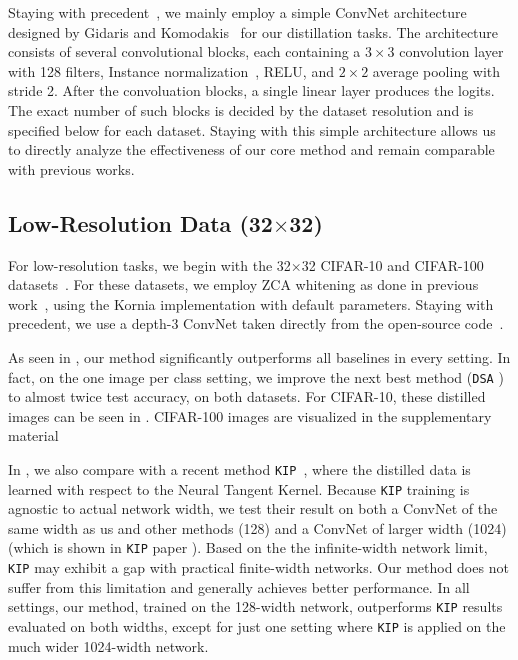 \documentclass[main.tex]{subfiles}
\begin{document}
Staying with precedent~\cite{dc, dsa, dm, nguyen2021dataset}, we mainly employ a simple ConvNet architecture designed by Gidaris and Komodakis~\cite{gidaris2018dynamic} for our distillation tasks. The architecture consists of several convolutional blocks, each containing a
$3\times 3$ convolution layer with 128 filters, Instance normalization~\cite{ulyanov2016instance}, RELU, and $2\times2$ average pooling with stride 2. After the convoluation blocks, a single linear layer produces the logits. The exact number of such blocks is decided by the dataset resolution and is specified below for each dataset.
Staying with this simple architecture allows us to directly analyze the effectiveness of our core method and remain comparable with previous works.

\subsection{Low-Resolution Data (32$\times$32)}

For low-resolution tasks, we begin with the 32$\times$32 CIFAR-10 and CIFAR-100 datasets~\cite{CIFAR10}. For these datasets, we employ ZCA whitening as done in previous work~\cite{nguyen2020dataset, nguyen2021dataset}, using the Kornia \cite{kornia} implementation with default parameters.
Staying with precedent, we use a depth-3 ConvNet taken directly from the open-source code~\cite{dc, dsa}.

As seen in , our method significantly outperforms all baselines in every setting. In fact, on the one image per class setting, we  improve the next best method (\texttt{DSA} \cite{dsa}) to almost twice test accuracy, on both datasets. For CIFAR-10, these distilled images can be seen in .  CIFAR-100 images are visualized in the supplementary material

In  , we also compare with a recent method \texttt{KIP}~\cite{nguyen2020dataset,nguyen2021dataset}, where the distilled data is learned with respect to the Neural Tangent Kernel. Because \texttt{KIP} training is agnostic to actual network width, we test their result on both a ConvNet of the same width as us and other methods (128) and a ConvNet of larger width (1024) (which is shown in \texttt{KIP} paper \citep{nguyen2021dataset}).  Based on the the infinite-width network limit, \texttt{KIP} may exhibit a gap with practical finite-width networks. Our method does not suffer from this limitation and generally achieves better performance.  In all settings, our method, trained on the 128-width network, outperforms \texttt{KIP} results evaluated on both widths, except for just one setting where \texttt{KIP} is applied on the much wider 1024-width network. 
\end{document}
